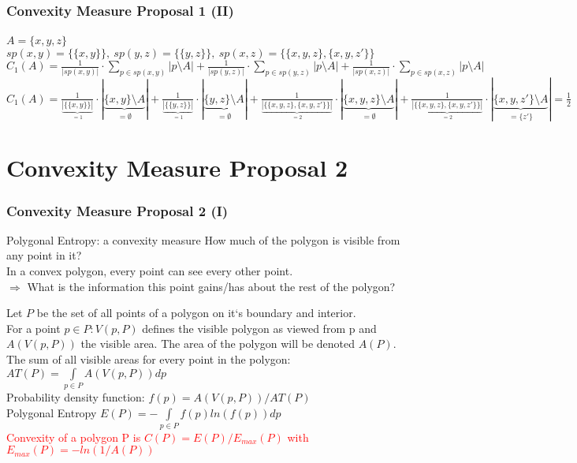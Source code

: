 \documentclass[
    11pt, %
    aspectratio=169, %
    handout
]{beamer}
\begin{document}
\begin{frame}
\frametitle{Convexity Measure Proposal 1 (II)}
\begin{center}
\end{center}
\pause
$A=\{x,y,z\}$ ~~ $sp(x,y)=\{\{x,y\}\},~ sp(y,z)=\{\{y,z\}\},~ sp(x,z)=\{\{x,y,z\},\{x,y,z'\}\}$
\pause 
$C_1(A)= \frac{1}{|sp(x,y)|} \cdot \underset{p \in sp(x,y)}{\sum} |p\setminus A| + \frac{1}{|sp(y,z)|} \cdot \underset{p \in sp(y,z)}{\sum} |p\setminus A| + \frac{1}{|sp(x,z)|} \cdot \underset{p \in sp(x,z)}{\sum} |p\setminus A|$
\pause
$C_1(A)= \frac{1}{\underbrace{|\{\{x,y\}\}|}_{=1}} \cdot | \underbrace{\{x,y\} \setminus A}_{=\emptyset} | + \frac{1}{\underbrace{|\{\{y,z\}\}|}_{=1}} \cdot | \underbrace{\{y,z\} \setminus A}_{=\emptyset} | + \frac{1}{\underbrace{|\{\{x,y,z\},\{x,y,z'\}\}|}_{=2}} \cdot | \underbrace{\{x,y,z\} \setminus A}_{=\emptyset} | + \frac{1}{\underbrace{|\{\{x,y,z\},\{x,y,z'\}\}|}_{=2}} \cdot | \underbrace{\{x,y,z'\} \setminus A}_{=\{z'\}} | = \frac{1}{2}
$
\end{frame}

\section{Convexity Measure Proposal 2}
\begin{frame}
\frametitle{Convexity Measure Proposal 2 (I)}
\begin{block}{Polygonal Entropy: a convexity measure \cite{Lab2324BigData/PolygonalEntropy}}
How much of the polygon is visible from any point in it? \\ \pause 
In a convex polygon, every point can see every other point. \\
$\Rightarrow$ What is the information this point gains/has about the rest of the polygon?
\end{block}
\pause
Let $P$ be the set of all points of a polygon on it`s boundary and interior. \\
For a point $p \in P: V(p,P)$ defines the visible polygon as viewed from p and $A(V(p,P))$ the visible area. The area of the polygon will be denoted $A(P)$. \\ 
\pause
The sum of all visible areas for every point in the polygon:
$AT(P)=\underset{p \in P}{\int} A(V(p,P)) dp$ \\
\pause
Probability density function:
$f(p) = A(V(p,P))/AT(P)$ \\
\pause
Polygonal Entropy $ E(P) = -\underset{p \in P}{\int} f(p) ln (f(p)) dp$ \\
\pause
\textcolor{red}{Convexity of a polygon P is $C(P) = E(P) / E_{max}(P)$ with $E_{max}(P) = -ln(1/A(P))$}\\
\end{frame}
\end{document}
